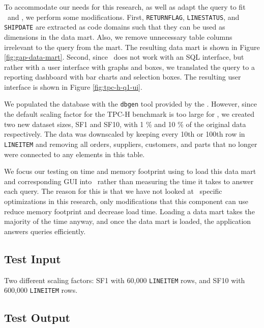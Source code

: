

To accommodate our needs for this research, as well as adapt the query to fit \gap~and \gd, we perform some modifications. First, \texttt{RETURNFLAG}, \texttt{LINESTATUS}, and \texttt{SHIPDATE} are extracted as code domains such that they can be used as dimensions in the data mart. Also, we remove unnecessary table columns irrelevant to the query from the mart. The resulting data mart is shown in Figure \ref{fig:gap-data-mart}. Second, since \gd~does not work with an SQL interface, but rather with a user interface with graphs and boxes, we translated the query to a reporting dashboard with bar charts and selection boxes. The resulting user interface is shown in Figure \ref{fig:tpc-h-q1-ui}. 

We populated the database with the \texttt{dbgen} tool provided by the . However, since the default scaling factor for the TPC-H benchmark is too large for \gap, we created two new dataset sizes, SF1 and SF10, with 1 \% and 10 \% of the original data respectively. The data was downscaled by keeping every 10th or 100th row in \texttt{LINEITEM} and removing all orders, suppliers, customers, and parts that no longer were connected to any elements in this table. 

We focus our testing on time and memory footprint using to load this data mart and corresponding GUI into \gd~rather than measuring the time it takes to answer each query. The reason for this is that we have not looked at \gd~specific optimizations in this research, only modifications that this component can use reduce memory footprint and decrease load time. Loading a data mart takes the majority of the time anyway, and once the data mart is loaded, the application answers queries efficiently.

\subsection{Test Input}
\label{sub:Test Input}

Two different scaling factors: SF1 with 60,000 \texttt{LINEITEM} rows, and SF10 with 600,000 \texttt{LINEITEM} rows.

\subsection{Test Output}
\label{sub:Test Output}

